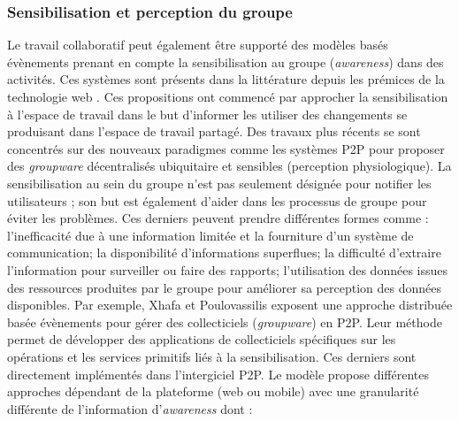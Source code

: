 \subsubsection{Sensibilisation et perception du groupe}
Le travail collaboratif peut également être supporté des modèles basés 
évènements prenant en compte la sensibilisation au groupe (\textit{awareness}) 
dans des activités. Ces systèmes sont présents dans la littérature depuis les 
prémices de la technologie web \cite{Bentley1997,Steinfield1999,You2001}. Ces 
propositions ont commencé par approcher la sensibilisation à l'espace de travail 
dans le but d'informer les utiliser des changements se produisant dans l'espace 
de travail partagé. 
Des travaux plus récents se sont concentrés sur des 
nouveaux paradigmes comme les systèmes \gls{P2P} pour proposer des 
\textit{groupware} décentralisés ubiquitaire et sensibles (perception 
physiologique). La sensibilisation au sein du groupe n'est pas seulement désignée 
pour notifier les utilisateurs ; son but est également d'aider dans les processus de 
groupe pour éviter les problèmes. Ces derniers peuvent prendre différentes 
formes comme :  l'inefficacité due à une information limitée et la fourniture d'un 
système de communication; la disponibilité d'informations superflues; la difficulté 
d'extraire l'information pour surveiller ou faire des rapports; l'utilisation des 
données issues  des ressources produites par le groupe pour améliorer sa 
perception des données disponibles. Par exemple, Xhafa et Poulovassilis 
\cite{Xhafa2010} exposent une approche distribuée basée évènements pour gérer 
des collecticiels (\textit{groupware}) en \gls{P2P}. 
Leur méthode permet de développer des applications de collecticiels spécifiques  
sur les opérations et les services primitifs liés à la sensibilisation. Ces derniers 
sont directement implémentés dans l'intergiciel \gls{P2P}. Le modèle propose 
différentes approches dépendant de la plateforme (web ou mobile) avec une 
granularité différente de l'information 
d'\textit{awareness} dont :

